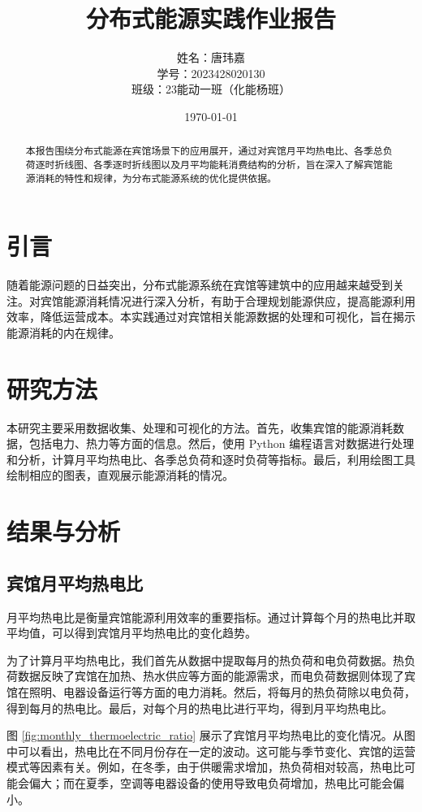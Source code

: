 \documentclass[UTF8]{ctexart}
\title{分布式能源实践作业报告}
\author{姓名：唐玮嘉 \\ 学号：2023428020130 \\ 班级：23能动一班（化能杨班）}
\date{\today}
\begin{document}
\maketitle

\begin{abstract}
本报告围绕分布式能源在宾馆场景下的应用展开，通过对宾馆月平均热电比、各季总负荷逐时折线图、各季逐时折线图以及月平均能耗消费结构的分析，旨在深入了解宾馆能源消耗的特性和规律，为分布式能源系统的优化提供依据。
\end{abstract}

\section{引言}
随着能源问题的日益突出，分布式能源系统在宾馆等建筑中的应用越来越受到关注。对宾馆能源消耗情况进行深入分析，有助于合理规划能源供应，提高能源利用效率，降低运营成本。本实践通过对宾馆相关能源数据的处理和可视化，旨在揭示能源消耗的内在规律。

\section{研究方法}
本研究主要采用数据收集、处理和可视化的方法。首先，收集宾馆的能源消耗数据，包括电力、热力等方面的信息。然后，使用 Python 编程语言对数据进行处理和分析，计算月平均热电比、各季总负荷和逐时负荷等指标。最后，利用绘图工具绘制相应的图表，直观展示能源消耗的情况。

\section{结果与分析}

\subsection{宾馆月平均热电比}
月平均热电比是衡量宾馆能源利用效率的重要指标。通过计算每个月的热电比并取平均值，可以得到宾馆月平均热电比的变化趋势。

为了计算月平均热电比，我们首先从数据中提取每月的热负荷和电负荷数据。热负荷数据反映了宾馆在加热、热水供应等方面的能源需求，而电负荷数据则体现了宾馆在照明、电器设备运行等方面的电力消耗。然后，将每月的热负荷除以电负荷，得到每月的热电比。最后，对每个月的热电比进行平均，得到月平均热电比。

图 \ref{fig:monthly_thermoelectric_ratio} 展示了宾馆月平均热电比的变化情况。从图中可以看出，热电比在不同月份存在一定的波动。这可能与季节变化、宾馆的运营模式等因素有关。例如，在冬季，由于供暖需求增加，热负荷相对较高，热电比可能会偏大；而在夏季，空调等电器设备的使用导致电负荷增加，热电比可能会偏小。
\end{document}
